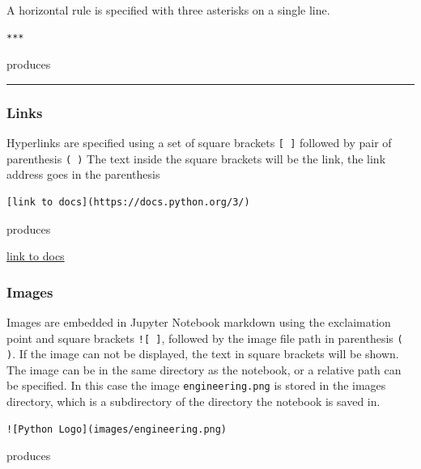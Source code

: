 \documentclass{book}
\begin{document}
A horizontal rule is specified with three asterisks on a single line.

\begin{lstlisting}
***
\end{lstlisting}

produces

\begin{center}\rule{0.5\linewidth}{\linethickness}\end{center}

\subsubsection{Links}\label{links}

Hyperlinks are specified using a set of square brackets \lstinline![ ]!
followed by pair of parenthesis \lstinline!( )! The text inside the
square brackets will be the link, the link address goes in the
parenthesis

\begin{lstlisting}
[link to docs](https://docs.python.org/3/)
\end{lstlisting}

produces

\href{https://docs.python.org/3/}{link to docs}

\subsubsection{Images}\label{images}

Images are embedded in Jupyter Notebook markdown using the exclaimation
point and square brackets \lstinline"![ ]", followed by the image file
path in parenthesis \lstinline!( )!. If the image can not be displayed,
the text in square brackets will be shown. The image can be in the same
directory as the notebook, or a relative path can be specified. In this
case the image \lstinline!engineering.png! is stored in the images
directory, which is a subdirectory of the directory the notebook is
saved in.

\begin{lstlisting}
![Python Logo](images/engineering.png)
\end{lstlisting}

produces
\end{document}
